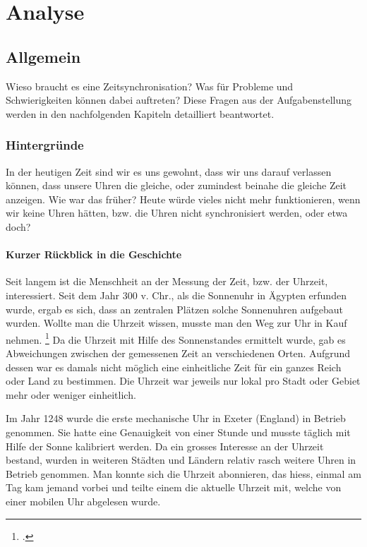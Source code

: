
\chapter{Analyse}
\section{Allgemein}
Wieso braucht es eine Zeitsynchronisation? Was für Probleme und Schwierigkeiten können dabei auftreten? Diese Fragen aus der Aufgabenstellung werden in den nachfolgenden Kapiteln detailliert beantwortet.

\subsection{Hintergründe} \label{subsec:Analyse:Hintergruende}
In der heutigen Zeit sind wir es uns gewohnt, dass wir uns darauf verlassen können, dass unsere Uhren die gleiche, oder zumindest beinahe die gleiche Zeit anzeigen. 
Wie war das früher? Heute würde vieles nicht mehr funktionieren, wenn wir keine Uhren hätten, bzw. die Uhren nicht synchronisiert werden, oder etwa doch?

\subsubsection{Kurzer Rückblick in die Geschichte} \label{subsubsec:Analyse:BlickGeschichte}
Seit langem ist die Menschheit an der Messung der Zeit, bzw. der Uhrzeit, interessiert.
Seit dem Jahr 300 v. Chr., als die Sonnenuhr in Ägypten erfunden wurde, ergab es sich, dass an zentralen Plätzen solche Sonnenuhren aufgebaut wurden. Wollte man die Uhrzeit wissen, musste man den Weg zur Uhr in Kauf nehmen. \footcite{wikiSunclock}
Da die Uhrzeit mit Hilfe des Sonnenstandes ermittelt wurde, gab es Abweichungen zwischen der gemessenen Zeit an verschiedenen Orten. Aufgrund dessen war es damals nicht möglich eine einheitliche Zeit für ein ganzes Reich oder Land zu bestimmen. Die Uhrzeit war jeweils nur lokal pro Stadt oder Gebiet mehr oder weniger einheitlich.

Im Jahr 1248 wurde die erste mechanische Uhr in Exeter (England) in Betrieb genommen. Sie hatte eine Genauigkeit von einer Stunde und musste täglich mit Hilfe der Sonne kalibriert werden.
Da ein grosses Interesse an der Uhrzeit bestand, wurden in weiteren Städten und Ländern relativ rasch weitere Uhren in Betrieb genommen.
Man konnte sich die Uhrzeit abonnieren, das hiess, einmal am Tag kam jemand vorbei und teilte einem die aktuelle Uhrzeit mit, welche von einer mobilen Uhr abgelesen wurde.


